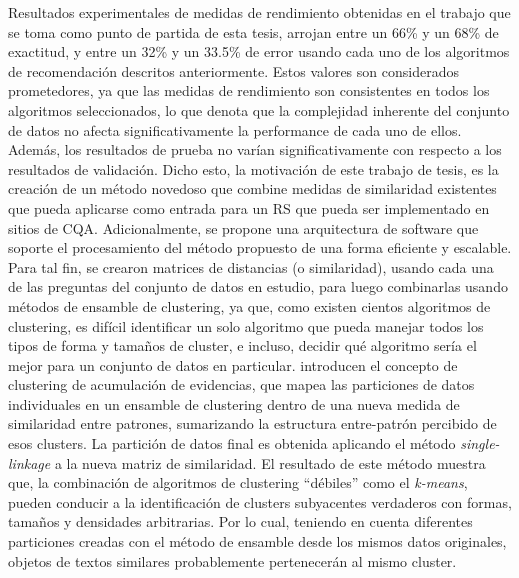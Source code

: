 \bigskip Resultados experimentales de medidas de rendimiento obtenidas en el trabajo que se toma como punto de partida de esta tesis, arrojan entre un 66\% y un 68\% de exactitud, y entre un 32\% y un 33.5\% de error usando cada uno de los algoritmos de recomendación descritos anteriormente. Estos valores son considerados prometedores, ya que las medidas de rendimiento son consistentes en todos los algoritmos seleccionados, lo que denota que la complejidad inherente del conjunto de datos no afecta significativamente la performance de cada uno de ellos. Además, los resultados de prueba no varían significativamente con respecto a los resultados de validación. Dicho esto, la motivación de este trabajo de tesis, es la creación de un método novedoso que combine medidas de similaridad existentes que pueda aplicarse como entrada para un RS que pueda ser implementado en sitios de CQA. Adicionalmente, se propone una arquitectura de software que soporte el procesamiento del método propuesto de una forma eficiente y escalable. Para tal fin, se crearon matrices de distancias (o similaridad), usando cada una de las preguntas del conjunto de datos en estudio, para luego combinarlas usando métodos de ensamble de clustering, ya que, como existen cientos algoritmos de clustering, es difícil identificar un solo algoritmo que pueda manejar todos los tipos de forma y tamaños de cluster, e incluso, decidir qué algoritmo sería el mejor para un conjunto de datos en particular. \cite{fred2005combining} introducen el concepto de clustering de acumulación de evidencias, que mapea las particiones de datos individuales en un ensamble de clustering dentro de una nueva medida de similaridad entre patrones, sumarizando la estructura entre-patrón percibido de esos clusters. La partición de datos final es obtenida aplicando el método \textit{single-linkage} a la nueva matriz de similaridad. El resultado de este método muestra que, la combinación de algoritmos de clustering “débiles” como el \textit{k-means}, pueden conducir a la identificación de clusters subyacentes verdaderos con formas, tamaños y densidades arbitrarias. Por lo cual, teniendo en cuenta diferentes particiones creadas con el método de ensamble desde los mismos datos originales, objetos de textos similares probablemente pertenecerán al mismo cluster.

